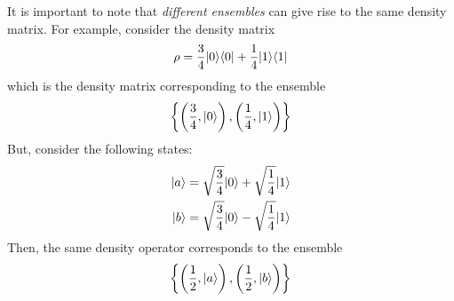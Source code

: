 It is important to note that \textit{different ensembles} can give rise to the same density matrix. For example, consider the density matrix 
\begin{equation*}
    \rho = \frac{3}{4}|0\rangle\langle0| + \frac{1}{4}|1\rangle\langle1|
\end{equation*}
which is the density matrix corresponding to the ensemble 
\begin{equation*}
    \left\{\left(\frac{3}{4}, |0\rangle\right),\left(\frac{1}{4}, |1\rangle\right)\right\}
\end{equation*}
But, consider the following states:
\begin{align*}
    |a\rangle &= \sqrt{\frac{3}{4}}|0\rangle + \sqrt{\frac{1}{4}}|1\rangle\\
    |b\rangle &= \sqrt{\frac{3}{4}}|0\rangle - \sqrt{\frac{1}{4}}|1\rangle
\end{align*}
Then, the same density operator corresponds to the ensemble
\begin{equation*}
    \left\{\left(\frac{1}{2},|a\rangle\right),\left(\frac{1}{2},|b\rangle\right)\right\}
\end{equation*}